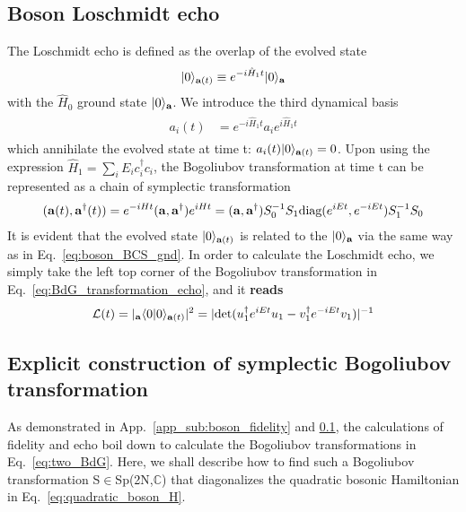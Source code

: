 \subsection{Boson Loschmidt echo}
\label{app_sub:boson_Loschmidt_echo}

The Loschmidt echo is defined as the overlap of the evolved state
\begin{eqnarray}\begin{aligned}
|0\rangle_{{\bf a}(t)}\equiv e^{-i\hat{H}_1t}|0\rangle_{\bf a}
\end{aligned}\end{eqnarray}
with the $\hat{H}_0$ ground state $|0\rangle_{\bf a}$. We introduce the third dynamical basis
\begin{eqnarray}\begin{aligned}
a_i(t)&=e^{-i\hat{H}_1t}a_ie^{i\hat{H}_1t}
\end{aligned}\end{eqnarray}
which annihilate the evolved state at time t: $a_i(t)|0\rangle_{{\bf a}(t)}=0$. Upon using the expression $\hat{H}_1=\sum_iE_ic_i^\dagger c_i$, the Bogoliubov transformation at time t can be represented as a chain of symplectic transformation
\begin{eqnarray}\begin{aligned}
\label{eq:BdG_transformation_echo}
({\bf a}(t),{\bf a}^\dagger(t))=e^{-iHt}
({\bf a} , {\bf a}^\dagger)e^{iHt}=({\bf a},{\bf a}^\dagger)S_0^{-1}S_1\text{diag}(e^{iEt},e^{-iEt})S_1^{-1}S_0
\end{aligned}\end{eqnarray}
It is evident that the evolved state $|0\rangle_{{\bf a}(t)}$ is related to the $|0\rangle_{{\bf a}}$ via the same way as in Eq.~\eqref{eq:boson_BCS_gnd}. In order to calculate the Loschmidt echo, we simply take the left top corner of the Bogoliubov transformation in Eq.~\eqref{eq:BdG_transformation_echo}, and it {\bf\color{red}reads}
\begin{eqnarray}\begin{aligned}
\label{eq:echo_t}
\mathcal{L}(t)=|_{\bf a}\langle0|0\rangle_{{\bf a}(t)}|^2=|\text{det}(u_1^\dagger e^{iEt}u_1-v_1^\dagger e^{-iEt}v_1)|^{-1}
\end{aligned}\end{eqnarray}

\subsection{Explicit construction of symplectic Bogoliubov transformation}
\label{app_sub:construction_Bogoliubov}
As demonstrated in App.~\ref{app_sub:boson_fidelity} and \ref{app_sub:boson_Loschmidt_echo}, the calculations of fidelity and echo boil down to calculate the Bogoliubov transformations in Eq.~\eqref{eq:two_BdG}. Here, we shall describe how to find such a Bogoliubov transformation S$\in$Sp(2N,$\mathbb{C}$) that diagonalizes the quadratic bosonic Hamiltonian in Eq.~\eqref{eq:quadratic_boson_H}. 

